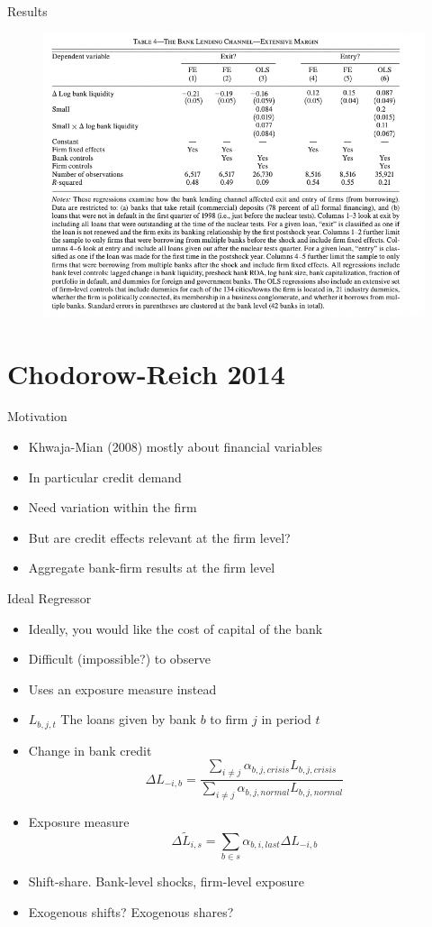 \documentclass[english,xcolor=svgnames]{beamer}
\begin{document}
\begin{frame}{Results}
\begin{figure}
\includegraphics[scale=0.35]{figures/km_4}
\end{figure}
\end{frame}


\section{Chodorow-Reich 2014}

\begin{frame}{Motivation}
\begin{itemize}
\item Khwaja-Mian (2008) mostly about financial variables
\item In particular credit demand
\item Need variation within the firm
\item But are credit effects relevant at the firm level?
\item Aggregate bank-firm results at the firm level
\end{itemize}
\end{frame}


\begin{frame}{Ideal Regressor}
\begin{itemize}
\item Ideally, you would like the cost of capital of the bank
\item Difficult (impossible?) to observe
\item Uses an exposure measure instead
\item $L_{b,j,t}$ The loans given by bank $b$ to firm $j$ in period $t$
\item Change in bank credit
$$\Delta L_{-i,b} = \frac{\sum_{i \neq j} \alpha_{b,j,crisis} L_{b,j,crisis}}{\sum_{i \neq j} \alpha_{b,j,normal} L_{b,j,normal}}$$
\item Exposure measure
$$\Delta \tilde{L}_{i,s} = \sum_{b \in s} \alpha_{b,i,last} \Delta L_{-i,b}$$
\item Shift-share. Bank-level shocks, firm-level exposure
\item Exogenous shifts? Exogenous shares?
\end{itemize}
\end{frame}
\end{document}
